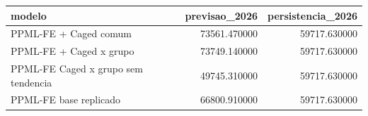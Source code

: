 \begin{tabular}{lrr}
\toprule
modelo & previsao_2026 & persistencia_2026 \\
\midrule
PPML-FE + Caged comum & 73561.470000 & 59717.630000 \\
PPML-FE + Caged x grupo & 73749.140000 & 59717.630000 \\
PPML-FE Caged x grupo sem tendencia & 49745.310000 & 59717.630000 \\
PPML-FE base replicado & 66800.910000 & 59717.630000 \\
\bottomrule
\end{tabular}
